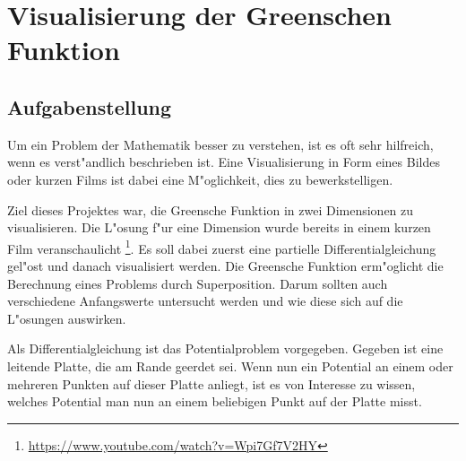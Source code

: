 \chapter{Visualisierung der Greenschen Funktion\label{chapter:green}}
\begin{refsection}

\section{Aufgabenstellung}

Um ein Problem der Mathematik besser zu verstehen, ist es oft sehr
hilfreich, wenn es verst"andlich beschrieben ist. Eine Visualisierung
in Form eines Bildes oder kurzen Films ist dabei eine M"oglichkeit,
dies zu bewerkstelligen.
	
Ziel dieses Projektes war, die Greensche Funktion in zwei Dimensionen
zu visualisieren. Die L"osung f"ur eine Dimension wurde bereits in
einem kurzen Film veranschaulicht
\footnote{\url{https://www.youtube.com/watch?v=Wpi7Gf7V2HY}}. Es
soll dabei zuerst eine partielle Differentialgleichung gel"ost und
danach visualisiert werden. Die Greensche Funktion erm"oglicht die
Berechnung eines Problems durch Superposition. Darum sollten auch
verschiedene Anfangswerte untersucht werden und wie diese sich auf
die L"osungen auswirken.
	
Als Differentialgleichung ist das Potentialproblem vorgegeben.
Gegeben ist eine leitende Platte, die am Rande geerdet sei. Wenn
nun ein Potential an einem oder mehreren Punkten auf dieser Platte
anliegt, ist es von Interesse zu wissen, welches Potential man nun
an einem beliebigen Punkt auf der Platte misst.


\end{refsection}
